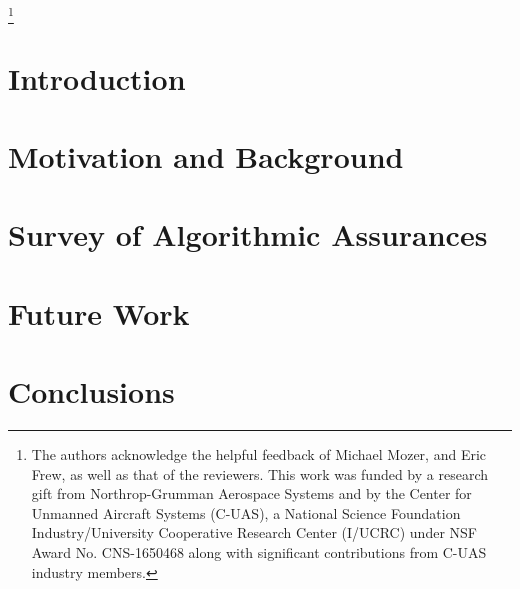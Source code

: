 \documentclass[format=manuscript, screen,review=true]{acmart}
\begin{document}

\thanks{The authors acknowledge the helpful feedback of Michael Mozer, and Eric Frew, as well as that of the reviewers. This work was funded by a research gift from Northrop-Grumman Aerospace Systems and by the Center for Unmanned Aircraft Systems (C-UAS), a National Science Foundation Industry/University Cooperative Research Center (I/UCRC) under NSF Award No. CNS-1650468 along with significant contributions from C-UAS industry members.}

\maketitle

\section{Introduction}\label{sec:introduction}


\section{Motivation and Background} \label{sec:background}


\section{Survey of Algorithmic Assurances} \label{sec:synthesis}


\section{Future Work} \label{sec:future_work}


\section{Conclusions}\label{sec:conclusions}




\end{document}
